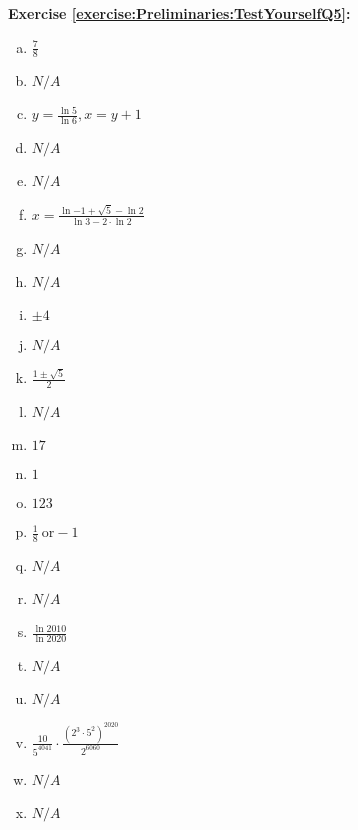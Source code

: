 \noindent\textbf{Exercise \ref{exercise:Preliminaries:TestYourselfQ5}:}
\begin{enumerate}[(a)]
\item  $ \frac{7}{8}$ 
\item  $ N/A$
\item  $ y = \frac{\ln{5}}{\ln{6} } , x = y + 1$
\item  $ N/A$
\item  $ N/A$
\item  $x = \frac{\displaystyle \ln{-1 + \sqrt{5}} - \ln{2} }{\displaystyle \ln{3} - 2 \cdot \ln{2} }$
\item  $ N/A$
\item  $ N/A$
\item  $ \pm 4 $
\item  $ N/A$
\item  $ \frac{ 1 \pm \sqrt{5} }{2}$
\item  $ N/A$
\item  $ 17$
\item  $ 1 $
\item  $ 123 $
\item  $ \frac{1}{8} ~\text{or} -1$
\item  $ N/A$
\item  $ N/A$
\item  $ \frac{ \ln{2010} }{ \ln{2020} }$
\item  $ N/A$
\item  $ N/A$
\item  $  \frac{ \displaystyle 10}{\displaystyle 5^{4041}} \cdot \frac{\displaystyle ( 2^3 \cdot 5^2  ) ^ {2020} }{\displaystyle 2^{6060} }$
\item  $ N/A$
\item  $ N/A$
\end{enumerate}